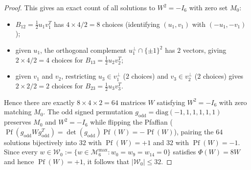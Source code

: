 \documentclass[11pt,a4paper]{article}
\theoremstyle{plain}
\theoremstyle{definition}
\theoremstyle{remark}
\newcommand{\Pf}{\operatorname{Pf}}
\newcommand{\Mman}{\mathcal{M}_6}
\begin{document}
\begin{proof}
This gives an exact count of all solutions to $W^2 = -I_6$ with zero set $M_0$:
\begin{itemize}[leftmargin=1.8em, itemsep=2pt]
  \item $B_{12} = \frac{1}{2}u_1 v_1^T$ has $4 \times 4 / 2 = 8$ choices (identifying $(u_1, v_1)$ with $(-u_1, -v_1)$);
  \item given $u_1$, the orthogonal complement $u_1^\perp \cap \{\pm 1\}^2$ has $2$ vectors, giving $2 \times 4 / 2 = 4$ choices for $B_{13} = \frac{1}{2}u_2 v_2^T$;
  \item given $v_1$ and $v_2$, restricting $u_3 \in v_1^\perp$ ($2$ choices) and $v_3 \in v_2^\perp$ ($2$ choices) gives $2 \times 2 / 2 = 2$ choices for $B_{23} = \frac{1}{2}u_3 v_3^T$.
\end{itemize}
Hence there are exactly $8 \times 4 \times 2 = 64$ matrices $W$ satisfying $W^2 = -I_6$ with zero matching $M_0$. The odd signed permutation $g_{\mathrm{odd}} = \mathrm{diag}(-1, 1, 1, 1, 1, 1)$ preserves $M_0$ and $W^2 = -I_6$ while flipping the Pfaffian ($\Pf(g_{\mathrm{odd}} W g_{\mathrm{odd}}^T) = \det(g_{\mathrm{odd}})\Pf(W) = -\Pf(W)$), pairing the $64$ solutions bijectively into $32$ with $\Pf(W) = +1$ and $32$ with $\Pf(W) = -1$. Since every $w \in \mathcal{W}_0 := \{w \in \Mman^{\max} : w_0 = w_9 = w_{14} = 0\}$ satisfies $\Phi(W) = 8W$ and hence $\Pf(W) = +1$, it follows that $\lvert\mathcal{W}_0\rvert \le 32$.


\end{proof}
\end{document}
